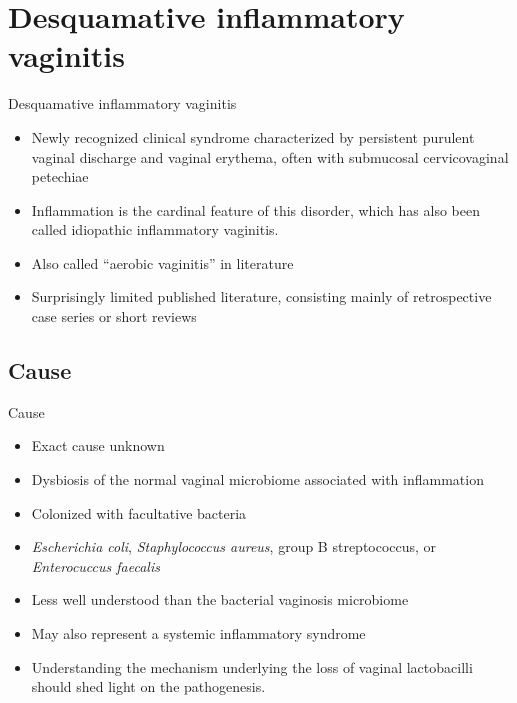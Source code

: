 \documentclass{beamer}
\begin{document}
\section{Desquamative inflammatory vaginitis}
\begin{frame}{Desquamative inflammatory vaginitis}
    \begin{itemize}
        \item Newly recognized clinical syndrome characterized by persistent
              purulent vaginal discharge and vaginal erythema, often with
              submucosal cervicovaginal petechiae
        \item Inflammation is the cardinal feature of this disorder, which has
              also been called idiopathic inflammatory vaginitis.
        \item Also called ``aerobic vaginitis'' in literature
        \item Surprisingly limited published literature, consisting mainly of
              retrospective case series or short reviews
    \end{itemize}
\end{frame}

\subsection{Cause}
\begin{frame}{Cause}
    \begin{itemize}
        \item Exact cause unknown
        \item Dysbiosis of the normal vaginal microbiome associated with inflammation
        \item Colonized with facultative bacteria
        \item \textit{Escherichia coli}, \textit{Staphylococcus aureus}, group
              B streptococcus, or \textit{Enterocuccus faecalis}
        \item Less well understood than the bacterial vaginosis microbiome
        \item May also represent a systemic inflammatory syndrome
        \item Understanding the mechanism underlying the loss of vaginal
              lactobacilli should shed light on the pathogenesis.
    \end{itemize}
\end{frame}
\end{document}
